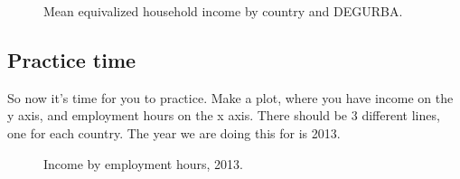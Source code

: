 \documentclass[
  letterpaper,
  DIV=11,
  numbers=noendperiod]{scrartcl}
\begin{document}
\begin{figure}


\caption{\label{fig-degurba-heqinc}Mean equivalized household income by
country and DEGURBA.}

\end{figure}%

\subsection{Practice time}\label{practice-time}

So now it's time for you to practice. Make a plot, where you have income
on the y axis, and employment hours on the x axis. There should be 3
different lines, one for each country. The year we are doing this for is
2013.

\begin{figure}


\caption{\label{fig-employment-income}Income by employment hours, 2013.}

\end{figure}%
\end{document}
